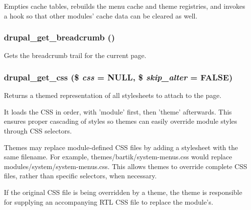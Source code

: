 Empties cache tables, rebuilds the menu cache and theme registries, and invokes a hook so that other modules' cache data can be cleared as well. \hypertarget{common_8inc_af1e9626192d1d2e5e63b370e88c03c7c}{
\subsubsection[{drupal\_\-get\_\-breadcrumb}]{\setlength{\rightskip}{0pt plus 5cm}drupal\_\-get\_\-breadcrumb ()}}
\label{common_8inc_af1e9626192d1d2e5e63b370e88c03c7c}
Gets the breadcrumb trail for the current page. \hypertarget{common_8inc_a2e308371f339fbb54967045ccbe4e88c}{
\subsubsection[{drupal\_\-get\_\-css}]{\setlength{\rightskip}{0pt plus 5cm}drupal\_\-get\_\-css (\$ {\em css} = {\ttfamily NULL}, \/  \$ {\em skip\_\-alter} = {\ttfamily FALSE})}}
\label{common_8inc_a2e308371f339fbb54967045ccbe4e88c}
Returns a themed representation of all stylesheets to attach to the page.

It loads the CSS in order, with 'module' first, then 'theme' afterwards. This ensures proper cascading of styles so themes can easily override module styles through CSS selectors.

Themes may replace module-\/defined CSS files by adding a stylesheet with the same filename. For example, themes/bartik/system-\/menus.css would replace modules/system/system-\/menus.css. This allows themes to override complete CSS files, rather than specific selectors, when necessary.

If the original CSS file is being overridden by a theme, the theme is responsible for supplying an accompanying RTL CSS file to replace the module's.


